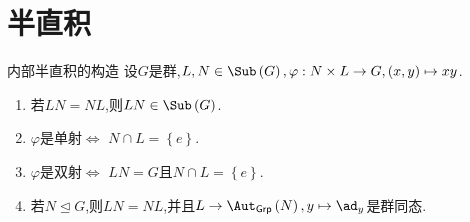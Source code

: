 \section{半直积}

\begin{proposition}{内部半直积的构造}{}
	设$G$是群,$L,N\in\Sub\left(G\right),\varphi:N\times L\to G,\left(x,y\right)\mapsto xy$.
	\begin{enumerate}
		\item 若$LN=NL$,则$LN\in\Sub\left(G\right)$.
		\item $\varphi$是单射$\iff$ $N\cap L=\left\{e\right\}$.
		\item $\varphi$是双射$\iff$ $LN=G$且$N\cap L=\left\{e\right\}$.
		\item 若$N\unlhd G$,则$LN=NL$,并且$L\to\Aut_{\mathsf{Grp}}\left(N\right),y\mapsto\ad_{y}$是群同态.
	\end{enumerate}
\end{proposition}

